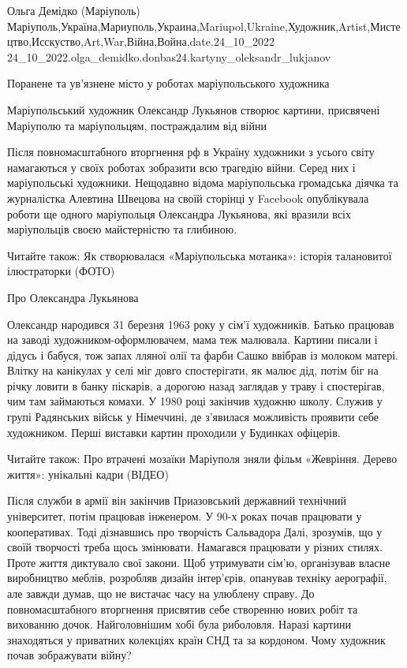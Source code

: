  
 
 
 
 

Ольга Демідко (Маріуполь)
Маріуполь,Україна,Мариуполь,Украина,Mariupol,Ukraine,Художник,Artist,Мистецтво,Исскуство,Art,War,Війна,Война,date.24_10_2022
24_10_2022.olga_demidko.donbas24.kartyny_oleksandr_lukjanov


Поранене та ув'язнене місто у роботах маріупольського художника

Маріупольський художник Олександр Лукьянов створює картини, присвячені
Маріуполю та маріупольцям, постраждалим від війни

Після повномасштабного вторгнення рф в Україну художники з усього світу
намагаються у своїх роботах зобразити всю трагедію війни. Серед них і
маріупольські художники. Нещодавно відома маріупольська громадська діячка та
журналістка Алевтина Швецова на своїй сторінці у Facebook опублікувала роботи
ще одного маріупольця Олександра Лукьянова, які вразили всіх маріупольців своєю
майстерністю та глибиною.

Читайте також: Як створювалася «Маріупольська мотанка»: історія талановитої ілюстраторки (ФОТО)

Про Олександра Лукьянова

Олександр народився 31 березня 1963 року у сім'ї художників. Батько працював на
заводі художником-оформлювачем, мама теж малювала. Картини писали і дідусь і
бабуся, тож запах лляної олії та фарби Сашко ввібрав із молоком матері. Влітку
на канікулах у селі міг довго спостерігати, як малює дід, потім біг на річку
ловити в банку піскарів, а дорогою назад заглядав у траву і спостерігав, чим
там займаються комахи. У 1980 році закінчив художню школу. Служив у групі
Радянських військ у Німеччині, де з'явилася можливість проявити себе
художником. Перші виставки картин проходили у Будинках офіцерів.

Читайте також: Про втрачені мозаїки Маріуполя зняли фільм «Жевріння. Дерево
життя»: унікальні кадри (ВІДЕО)

Після служби в армії він закінчив Приазовський державний технічний університет,
потім працював інженером. У 90-х роках почав працювати у кооперативах. Тоді
дізнавшись про творчість Сальвадора Далі, зрозумів, що у своїй творчості треба
щось змінювати. Намагався працювати у різних стилях. Проте життя диктувало свої
закони. Щоб утримувати сім'ю, організував власне виробництво меблів, розробляв
дизайн інтер'єрів, опанував техніку аерографії, але завжди думав, що не
вистачає часу на улюблену справу. До повномасштабного вторгнення присвятив себе
створенню нових робіт та вихованню дочок. Найголовнішим хобі була риболовля.
Наразі картини знаходяться у приватних колекціях країн СНД та за кордоном.
Чому художник почав зображувати війну?

